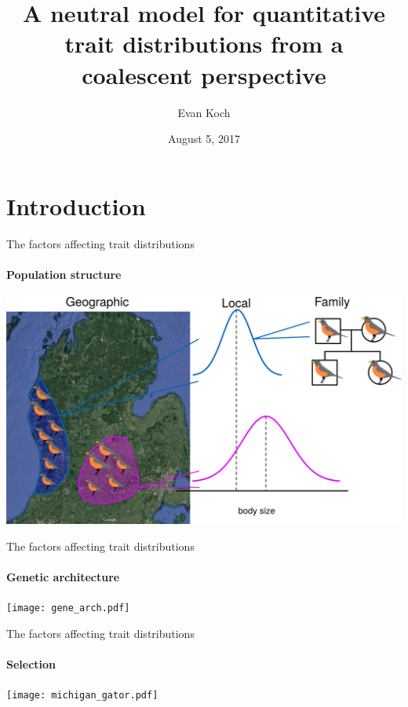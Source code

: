 \documentclass{beamer}
\title[quant gen coal]{A neutral model for quantitative trait
  distributions from a coalescent perspective}
\author{Evan Koch}
\date{August 5, 2017}
\begin{document}
\frame{\titlepage}

\section{Introduction}


\begin{frame}{The factors affecting trait distributions}
  \framesubtitle{Population structure}
  \begin{center}
    \includegraphics[width=\textwidth]{michigan_bird.png}
  \end{center}
\end{frame}

\begin{frame}{The factors affecting trait distributions}
  \framesubtitle{Genetic architecture}
  \begin{center}
    \texttt{[image: gene\_arch.pdf]}
  \end{center}
\end{frame}

\begin{frame}{The factors affecting trait distributions}
  \framesubtitle{Selection}
  \begin{center}
    \texttt{[image: michigan\_gator.pdf]}
  \end{center}
\end{frame}
\end{document}
